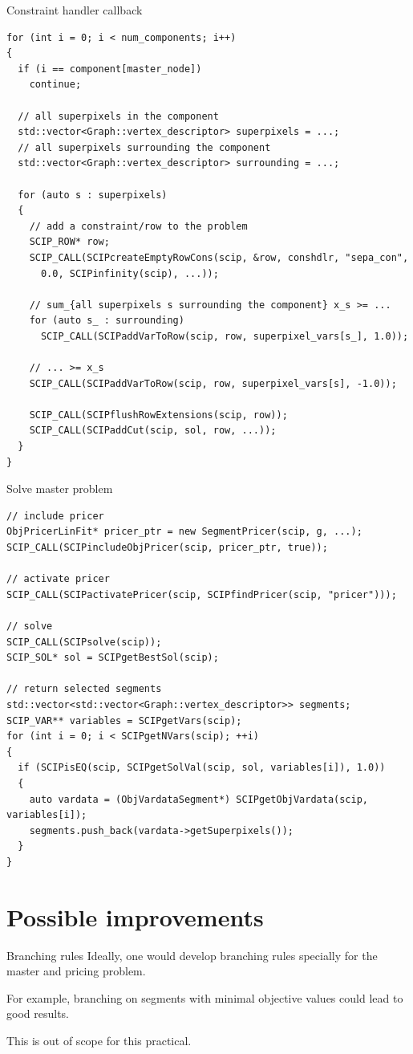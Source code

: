 \documentclass[fleqn]{beamer}
\begin{document}
\begin{frame}[fragile]{Constraint handler callback}
\begin{verbatim}
for (int i = 0; i < num_components; i++)
{
  if (i == component[master_node])
    continue;
    
  // all superpixels in the component
  std::vector<Graph::vertex_descriptor> superpixels = ...;
  // all superpixels surrounding the component
  std::vector<Graph::vertex_descriptor> surrounding = ...;
  
  for (auto s : superpixels)
  {
    // add a constraint/row to the problem
    SCIP_ROW* row;
    SCIP_CALL(SCIPcreateEmptyRowCons(scip, &row, conshdlr, "sepa_con",
      0.0, SCIPinfinity(scip), ...));

    // sum_{all superpixels s surrounding the component} x_s >= ...
    for (auto s_ : surrounding)
      SCIP_CALL(SCIPaddVarToRow(scip, row, superpixel_vars[s_], 1.0));

    // ... >= x_s
    SCIP_CALL(SCIPaddVarToRow(scip, row, superpixel_vars[s], -1.0));

    SCIP_CALL(SCIPflushRowExtensions(scip, row));
    SCIP_CALL(SCIPaddCut(scip, sol, row, ...));
  }
}
\end{verbatim}
\end{frame}

\begin{frame}[fragile]{Solve master problem}
\begin{verbatim}
// include pricer 
ObjPricerLinFit* pricer_ptr = new SegmentPricer(scip, g, ...);
SCIP_CALL(SCIPincludeObjPricer(scip, pricer_ptr, true));

// activate pricer 
SCIP_CALL(SCIPactivatePricer(scip, SCIPfindPricer(scip, "pricer")));

// solve
SCIP_CALL(SCIPsolve(scip));
SCIP_SOL* sol = SCIPgetBestSol(scip);

// return selected segments
std::vector<std::vector<Graph::vertex_descriptor>> segments;
SCIP_VAR** variables = SCIPgetVars(scip);
for (int i = 0; i < SCIPgetNVars(scip); ++i)
{
  if (SCIPisEQ(scip, SCIPgetSolVal(scip, sol, variables[i]), 1.0))
  {
    auto vardata = (ObjVardataSegment*) SCIPgetObjVardata(scip, variables[i]);
    segments.push_back(vardata->getSuperpixels());
  }
}
\end{verbatim}
\end{frame}
        
	\section{Possible improvements}
    \begin{frame}{Branching rules}
        Ideally, one would develop branching rules specially for the master and pricing problem.     
        
        For example, branching on segments with minimal objective values could lead to good results.
        
        This is out of scope for this practical.
    \end{frame}
    
\end{document}
